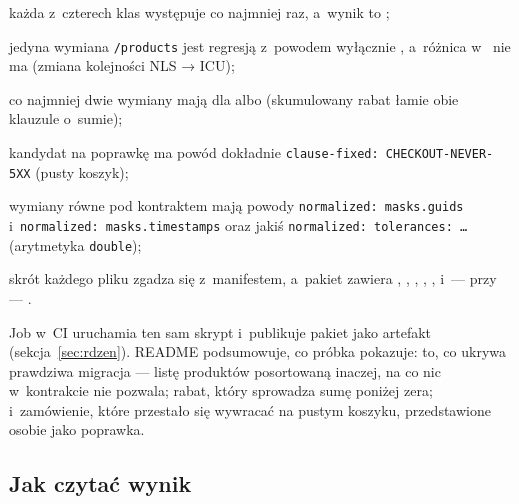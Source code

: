 \begin{checklista}
  \item każda z~czterech klas występuje co najmniej raz, a~wynik to ;
  \item jedyna wymiana \texttt{/products} jest regresją z~powodem wyłącznie
        , a~różnica w~ nie
        ma  (zmiana kolejności NLS → ICU);
  \item co najmniej dwie wymiany mają  dla
         albo 
        (skumulowany rabat łamie obie klauzule o~sumie);
  \item kandydat na poprawkę ma powód dokładnie \texttt{clause-fixed: CHECKOUT-NEVER-5XX}
        (pusty koszyk);
  \item wymiany równe pod kontraktem mają powody \texttt{normalized: masks.guids} i~\texttt{normalized: masks.timestamps} oraz jakiś
        \texttt{normalized: tolerances: …} (arytmetyka \texttt{double});
  \item skrót każdego pliku zgadza się z~manifestem, a~pakiet zawiera ,
        , , ,
        ,  i~--- przy
         --- .
\end{checklista}

Job  w~CI uruchamia ten sam skrypt i~publikuje pakiet jako artefakt
 (sekcja~\ref{sec:rdzen}). README podsumowuje, co próbka pokazuje:
to, co ukrywa prawdziwa migracja --- listę produktów posortowaną inaczej, na co nic w~kontrakcie nie pozwala; rabat, który sprowadza sumę poniżej zera; i~zamówienie, które przestało
się wywracać na pustym koszyku, przedstawione osobie jako poprawka.


\subsection{Jak czytać wynik}\label{sec:cli-wynik}

